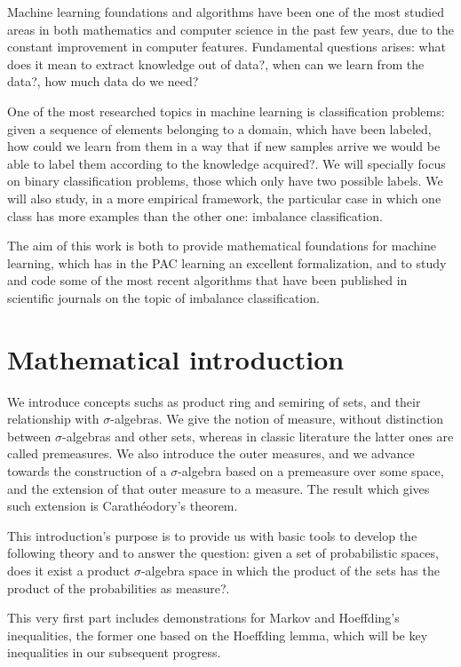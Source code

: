Machine learning foundations and algorithms have been one of the most studied areas in both mathematics and computer
science in the past few years, due to the constant improvement in computer features. Fundamental questions arises: 
what does it mean to extract knowledge out of data?, when can we learn from the data?, how much data do we need?

One of the most researched topics in machine learning is classification problems: given a sequence of elements belonging to
a domain, which have been labeled, how could we learn from them in a way that if new samples arrive we would be able to 
label them according to the knowledge acquired?. We will specially focus on binary classification problems, those which 
only have two possible labels. We will also study, in a more empirical framework, the particular case in which one 
class has more examples than the other one: imbalance classification.

The aim of this work is both to provide mathematical foundations for machine learning, which has in the PAC learning 
an excellent formalization, and to study and code some of the most recent algorithms that have been published in scientific
journals on the topic of imbalance classification.

\section*{Mathematical introduction}
We introduce concepts suchs as product ring and semiring of sets, and their relationship with $\sigma$-algebras. We give
the notion of measure, without distinction between $\sigma$-algebras and other sets, whereas in classic literature the latter
ones are called premeasures. We also introduce the outer measures, and we advance towards the construction of a $\sigma$-algebra
based on a premeasure over some space, and the extension of that outer measure to a measure. The result which gives
such extension is Carathéodory's theorem.

This introduction's purpose is to provide us with basic tools to develop the following theory and to answer the question:
given a set of probabilistic spaces, does it exist a product $\sigma$-algebra space in which the product of the sets has
the product of the probabilities as measure?.

This very first part includes demonstrations for Markov and Hoeffding's inequalities, the former one based on the Hoeffding
lemma, which will be key inequalities in our subsequent progress.


